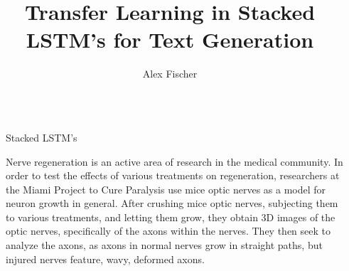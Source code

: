 \documentclass[final]{beamer}
\title{\fontsize{50}{20} \selectfont Transfer Learning in Stacked LSTM's for Text Generation} %
\author{Alex Fischer} %
\institute{University of Massachusetts, Amherst} %
\newlength{\colwidth}
\newlength{\columnseparation}
\begin{document}

\setlength{\belowcaptionskip}{0ex} %
\setlength\belowdisplayshortskip{2ex} %

\begin{frame}[t] %

\begin{columns}[t] %

\begin{column}{\columnseparation}\end{column} %

\begin{column}{\colwidth} %


\begin{block}{Stacked LSTM's}

Nerve regeneration is an active area of research in the medical community. In order to test the effects of various treatments on regeneration, researchers at the Miami Project to Cure Paralysis use mice optic nerves as a model for neuron growth in general. After crushing mice optic nerves, subjecting them to various treatments, and letting them grow, they obtain 3D images of the optic nerves, specifically of the axons within the nerves. They then seek to analyze the axons, as axons in normal nerves grow in straight paths, but injured nerves feature, wavy, deformed axons.


\end{block}
\end{column}
\end{columns}
\end{frame}
\end{document}
